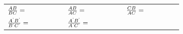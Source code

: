 {{\begin{center}
\begin{xtabular}[t]{|l|l|l|}
                \begin{math}\frac{AB}{BC}=\phantom{\rule{42.67912pt}{0ex}}\end{math}
               &
    
    
        
                \begin{math}\frac{AB}{AC}=\phantom{\rule{42.67912pt}{0ex}}\end{math}
               &
    
    
        
                \begin{math}\frac{CB}{AC}=\phantom{\rule{42.67912pt}{0ex}}\end{math}
     \tabularnewline{}
    
    
        
                \begin{math}\frac{{A}^{\text{'}}{B}^{\text{'}}}{{B}^{\text{'}}{C}^{\text{'}}}=\phantom{\rule{42.67912pt}{0ex}}\end{math}
               &
    
    
        
                \begin{math}\frac{{A}^{\text{'}}{B}^{\text{'}}}{{A}^{\text{'}}{C}^{\text{'}}}=\phantom{\rule{42.67912pt}{0ex}}\end{math}
               &
    
    
        

\end{xtabular}
\end{center}}}
